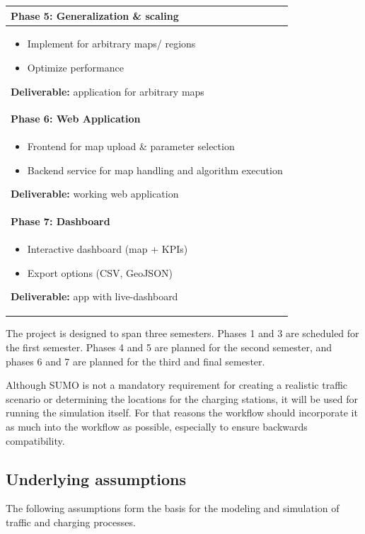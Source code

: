 \begin{longtable}{|p{}|}
\rowcolor{gray!20}
\textbf{Phase 5: Generalization \& scaling} \\
\hline
\begin{itemize}
\item Implement for arbitrary maps/ regions
\item Optimize performance
\end{itemize}
\textbf{Deliverable:} application for arbitrary maps \\
\hline

\rowcolor{gray!20}
\textbf{Phase 6: Web Application} \\
\hline
\begin{itemize}
\item Frontend for map upload \& parameter selection
\item Backend service for map handling and algorithm execution
\end{itemize}
\textbf{Deliverable:} working web application \\
\hline

\rowcolor{gray!20}
\textbf{Phase 7: Dashboard} \\
\hline
\begin{itemize}
\item Interactive dashboard (map + KPIs)
\item Export options (CSV, GeoJSON)
\end{itemize}
\textbf{Deliverable:} app with live-dashboard \\
\hline

\end{longtable}

The project is designed to span three semesters. Phases 1 and 3 are scheduled for the first semester. Phases 4 and 5 are planned for the second semester, and phases 6 and 7 are planned for the third and final semester.

Although SUMO is not a mandatory requirement for creating a realistic traffic scenario or determining the locations for the charging stations, it will be used for running the simulation itself. For that reasons the workflow should incorporate it as much into the workflow as possible, especially to ensure backwards compatibility.

\subsection{Underlying assumptions}
The following assumptions form the basis for the modeling and simulation of traffic and charging processes.

